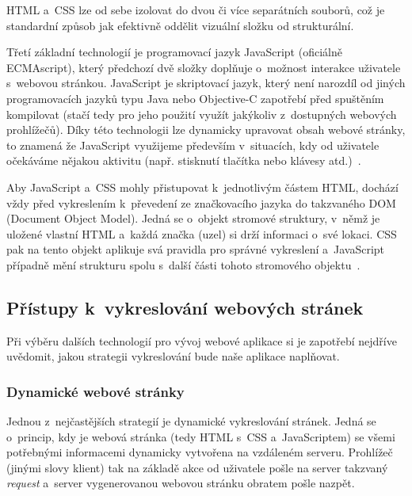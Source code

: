 HTML a~CSS lze od sebe izolovat do dvou či více separátních souborů, což je standardní způsob jak efektivně oddělit vizuální složku od strukturální.

Třetí základní technologií je programovací jazyk JavaScript (oficiálně ECMAscript), který předchozí dvě složky doplňuje o~možnost interakce uživatele s~webovou stránkou. JavaScript je skriptovací jazyk, který není narozdíl od jiných programovacích jazyků typu Java nebo Objective-C zapotřebí před spuštěním kompilovat (stačí tedy pro jeho použití využít jakýkoliv z~dostupných webových prohlížečů). Díky této technologii lze dynamicky upravovat obsah webové stránky, to znamená že JavaScript využijeme především v~situacích, kdy od uživatele očekáváme nějakou aktivitu (např. stisknutí tlačítka nebo klávesy atd.)~\parencite{javascript}.

Aby JavaScript a~CSS mohly přistupovat k~jednotlivým částem HTML, dochází vždy před vykreslením k~převedení ze značkovacího jazyka do takzvaného DOM (Document Object Model). Jedná se o~objekt stromové struktury, v~němž je uložené vlastní HTML a~každá značka (uzel) si drží informaci o~své lokaci. CSS pak na tento objekt aplikuje svá pravidla pro správné vykreslení a~JavaScript případně mění strukturu spolu s~další části tohoto stromového objektu~\parencite{howbrowserswork}.

\hypertarget{pux159uxedstupy-k-vykreslovuxe1nuxed-webovuxfdch-struxe1nek}{%
\subsection{Přístupy k~vykreslování webových stránek}\label{pux159uxedstupy-k-vykreslovuxe1nuxed-webovuxfdch-struxe1nek}}

Při výběru dalších technologií pro vývoj webové aplikace si je zapotřebí nejdříve uvědomit, jakou strategii vykreslování bude naše aplikace naplňovat.

\hypertarget{dynamickuxe9-webovuxe9-struxe1nky}{%
\subsubsection{Dynamické webové stránky}\label{dynamickuxe9-webovuxe9-struxe1nky}}

Jednou z~nejčastějších strategií je dynamické vykreslování stránek. Jedná se o~princip, kdy je webová stránka (tedy HTML s~CSS a~JavaScriptem) se všemi potřebnými informacemi dynamicky vytvořena na vzdáleném serveru. Prohlížeč (jinými slovy klient) tak na základě akce od uživatele pošle na server takzvaný \emph{request} a~server vygenerovanou webovou stránku obratem pošle nazpět.

